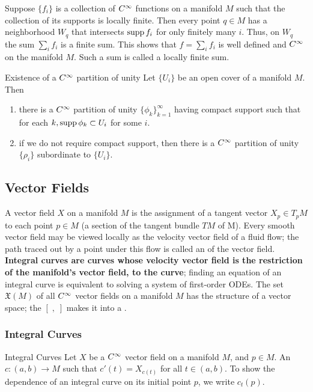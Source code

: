  Suppose \(\{f_i\}\) is a collection of \(C^\infty\) functions on a manifold \(M\) such that the collection of its supports is locally finite.
 Then every point \(q \in M\) has a neighborhood \(W_q\) that intersects \(\operatorname{supp} f_i\) for only finitely many \(i\). 
 Thus, on \(W_q\) the sum \(\sum_i f_i\) is a finite sum.
 This shows that \(f = \sum _i f_i\) is well defined and \(C^\infty\) on the manifold \(M\).
 Such a sum is called a locally finite sum.

 \begin{theorem}{Existence of a \(C^\infty\) partition of unity}{}
    Let \(\{U_i\}\) be an open cover of a manifold \(M\).
    Then 
    \begin{enumerate}
        \item there is a \(C^\infty\) partition of unity \(\{ \phi_k \}_{k=1}^\infty\) having compact support such that for each \(k, \operatorname{supp} \phi_k \subset U_i\) for some \(i\).
        \item if we do not require compact support, then there is a \(C^\infty\) partition of unity \(\{ \rho_i \}\) subordinate to \( \{ U_i \} \).
    \end{enumerate}
 \end{theorem}

 \subsection{Vector Fields}

 A vector field \(X\) on a manifold \(M\) is the assignment of a tangent vector \(X_p \in T_p M\) to each point \(p \in M\) (a section of the tangent bundle \(TM\) of M).
 Every smooth vector field may be viewed locally as the velocity vector field of a fluid flow; the path traced out by a point under this flow is called an  of the vector field.
 \textbf{Integral curves are curves whose velocity vector field is the restriction of the manifold's vector field, to the curve}; finding an equation of an integral curve is equivalent to solving a system of first-order ODEs.
 The set \(\mathfrak{X}(M)\) of all \(C^\infty\) vector fields on a manifold \(M\) has the structure of a vector space; the  \([\;,\;]\) makes it into a .

 \subsubsection{Integral Curves}

\begin{definition}{Integral Curves}{}
    Let \(X\) be a \(C^\infty\) vector field on a manifold \(M\), and \(p \in M\). 
    An  \(c \colon (a,b) \rightarrow M\) such that \(c'(t) = X_{c(t)}\) for all \(t \in (a,b)\).
    To show the dependence of an integral curve on its initial point \(p\), we write \(c_t(p)\).
\end{definition}

